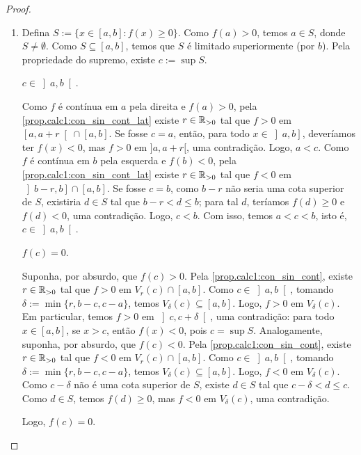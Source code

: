\begin{proof}
\begin{enumerate}[leftmargin=*, align=left, label=\textbf{(\alph*)}]
\begin{midproof}
            \end{midproof}
        Logo, $f(c) = 0$. \blackproof
                \item Defina $S := \{x \in [a,b] : f(x) \geq 0\}$. Como $f(a) > 0$, temos $a \in S$, donde $S \neq \emptyset$. Como $S \subseteq [a,b]$, temos que $S$ é limitado superiormente (por $b$). Pela propriedade do supremo, existe $c := \sup S$. 
            \begin{claim}
                $c \in \left]a,b \right[$.
            \end{claim}
            \begin{midproof}
                Como $f$ é contínua em $a$ pela direita e $f(a) > 0$, pela \cref{prop.calc1:con_sin_cont_lat} existe $r \in \mathbb{R}_{>0}$ tal que $f > 0$ em $\left[a, a+r \right[ \cap [a,b]$. Se fosse $c=a$, então, para todo $x \in \left]a,b \right]$, deveríamos ter $f(x) < 0$, mas $f > 0$ em $]a,a+r[$, uma contradição. Logo, $a < c$. Como $f$ é contínua em $b$ pela esquerda e $f(b) < 0$, pela \cref{prop.calc1:con_sin_cont_lat} existe $r \in \mathbb{R}_{>0}$ tal que $f < 0$ em $\left]b-r, b \right] \cap [a,b]$. Se fosse $c=b$, como $b-r$ não seria uma cota superior de $S$, existiria $d \in S$ tal que $b-r < d \leq b$; para tal $d$, teríamos $f(d) \geq 0$ e $f(d) < 0$, uma contradição. Logo, $c < b$. Com isso, temos $a<c<b$, isto é, $c \in \left] a,b \right[$. \whiteproof
            \end{midproof}
            \begin{claim}
                $f(c) = 0$.
            \end{claim}
            \begin{midproof}
                Suponha, por absurdo, que $f(c) > 0$. Pela \cref{prop.calc1:con_sin_cont}, existe $r \in \mathbb{R}_{>0}$ tal que $f > 0$ em $V_{r}(c) \cap [a,b]$. Como $c \in \left]a,b \right[$, tomando $\delta := \min \{r, b-c, c-a\}$, temos $V_{\delta}(c) \subseteq [a,b]$. Logo, $f>0$ em $V_{\delta}(c)$. Em particular, temos $f > 0$ em $\left]c, c+\delta \right[$, uma contradição: para todo $x \in [a,b]$, se $x > c$, então $f(x) < 0$, pois $c = \sup S$. Analogamente, suponha, por absurdo, que $f(c) < 0$. Pela \cref{prop.calc1:con_sin_cont}, existe $r \in \mathbb{R}_{>0}$ tal que $f < 0$ em $V_{r}(c) \cap [a,b]$. Como $c \in \left]a,b \right[$, tomando $\delta := \min \{r, b-c, c-a\}$, temos $V_{\delta}(c) \subseteq [a,b]$. Logo, $f<0$ em $V_{\delta}(c)$. Como $c - \delta$ não é uma cota superior de $S$, existe $d \in S$ tal que $c-\delta< d \leq c$. Como $d \in S$, temos $f(d) \geq 0$, mas $f < 0$ em $V_{\delta}(c)$, uma contradição. \whiteproof
            \end{midproof}
        Logo, $f(c) = 0$. \blackproof
    \end{enumerate}
\end{proof}

